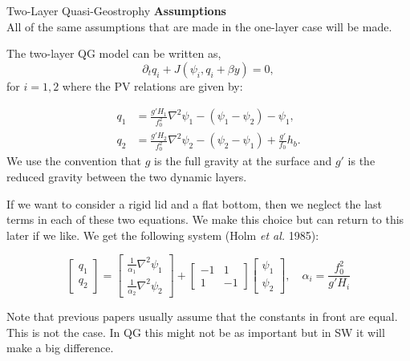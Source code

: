 \documentclass[12pt]{article}
\begin{document}
\newpage
\begin{section}{Two-Layer Quasi-Geostrophy}
    \textbf{Assumptions} \\
    All of the same assumptions that are made in the one-layer case will be made.

    The two-layer QG model can be written as,
    $$
    \partial_t q_i + J(\psi_i, q_i + \beta y) = 0,
    $$
    for $i=1,2$ where the PV relations are given by:

    \begin{align*}
        q_1 &= \frac{g'H_1}{f_0^2}\nabla^2 \psi_1 - (\psi_1 - \psi_2) - \psi_1,\\
        q_2 &= \frac{g'H_2}{f_0^2}\nabla^2 \psi_2 - (\psi_2 - \psi_1) + \frac{g'}{f_0} h_b.
    \end{align*}
    We use the convention that $g$ is the full gravity at the surface and $g'$ is the reduced gravity between the two dynamic layers.

    If we want to consider a rigid lid and a flat bottom, then we neglect the last terms in each of these two equations.  We make this choice but can return to this later if we like. We get the following system (Holm \emph{et al.} 1985):

    \begin{equation}
        \left[\begin{array}{c}
        q_1 \\
        q_2
        \end{array}\right]
        =
        \left[\begin{array}{c}
        \frac{1}{\alpha_1}\nabla^2 \psi_1 \\
        \frac{1}{\alpha_2}\nabla^2 \psi_2
        \end{array}\right]
        +
        \left[\begin{array}{cc}
        -1 & 1 \\
        1 & -1
        \end{array}\right]
        \left[\begin{array}{c}
        \psi_1 \\
        \psi_2
        \end{array}\right],
        \quad \alpha_i = \frac{f_0^2}{g'H_i}
    \end{equation}

    Note that previous papers usually assume that the constants in front are equal. This is not the case.  In QG this might not be as important but in SW it will make a big difference.


\end{section}
\end{document}
